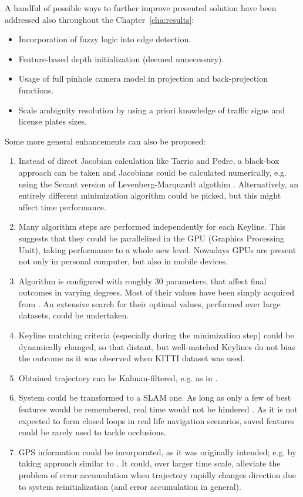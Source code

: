 
A handful of possible ways to further improve presented solution have been addressed also throughout the Chapter~\ref{cha:results}:
\begin{itemize}
	\item Incorporation of fuzzy logic into edge detection.
	\item Feature-based depth initialization (deemed unnecessary).
	\item Usage of full pinhole camera model in projection and back-projection functions.
	\item Scale ambiguity resolution by using a priori knowledge of traffic signs and license plates sizes.
\end{itemize}

Some more general enhancements can also be proposed:
\begin{enumerate}
	\item Instead of direct Jacobian calculation like Tarrio and Pedre, a black-box approach can be taken and Jacobians could be calculated numerically, e.g. using the Secant version of Levenberg-Marquardt algothim \cite{madsen2004methods}. Alternatively, an entirely different minimization algorithm could be picked, but this might affect time performance.
	\item Many algorithm steps are performed independently for each Keyline. This suggests that they could be parallelized in the GPU (Graphics Processing Unit), taking performance to a whole new level. Nowadays GPUs are present not only in personal computer, but also in mobile devices.
	\item Algorithm is configured with roughly 30 parameters, that affect final outcomes in varying degrees. Most of their values have been simply acquired from \cite{jose2015realtime}. An extensive search for their optimal values, performed over large datasets, could be undertaken.
	\item Keyline matching criteria (especially during the minimization step) could be dynamically changed, so that distant, but well-matched Keylines do not bias the outcome as it was observed when KITTI \cite{kitti} dataset was used.
	\item Obtained trajectory can be Kalman-filtered, e.g. as in \cite{min2015visual}.
	\item System could be transformed to a SLAM one. As long as only a few of best features would be remembered, real time would not be hindered \cite{monoslam}. As it is not expected to form closed loops in real life navigation scenarios, saved features could be rarely used to tackle occlusions.
	\item GPS information could be incorporated, as it was originally intended; e.g. by taking approach similar to \cite{accurate_global_localization}. It could, over larger time scale, alleviate the problem of error accumulation when trajectory rapidly changes direction due to system reinitialization (and error accumulation in general).
\end{enumerate}


